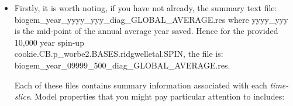 \begin{itemize}[noitemsep]

\vspace{2mm}
\item Firstly, it is worth noting, if you have not already, the summary text file: 
\\\textsf{\footnotesize biogem\_year\_yyyy\_yyy\_diag\_GLOBAL\_AVERAGE.res}
where \textsf{\footnotesize yyyy\_yyy} is the mid-point of the annual average year saved. Hence for the provided 10,000 year spin-up \\\textsf{\footnotesize cookie.CB.p\_worbe2.BASES.ridgwelletal.SPIN}, the file is: \\\textsf{\footnotesize biogem\_year\_09999\_500\_diag\_GLOBAL\_AVERAGE.res}. 

\vspace{1mm}
Each of these files contains summary information associated with each \textit{time-slice}. Model properties that you might pay particular attention to includes:


\end{itemize}
